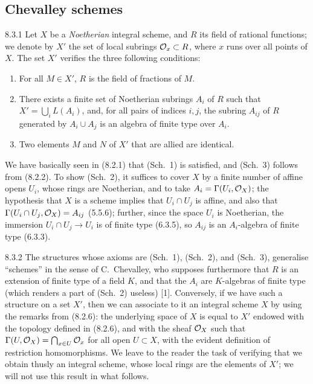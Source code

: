 \documentclass[../main.tex]{subfiles}
\begin{document}
\subsection{Chevalley schemes}

\begin{cx}{8.3.1}
    Let $X$ be a \emph{Noetherian} integral scheme, and $R$ its field of rational functions; we denote by $X'$ the set of local subrings $\mathcal{O}_x\subset R$, where $x$ runs over all points of $X$.
    The set $X'$ verifies the three following conditions:
    \begin{enumerate}
        \item[(Sch. 1)] For all $M\in X'$, $R$ is the field of fractions of $M$.
        \item[(Sch. 2)] There exists a finite set of Noetherian subrings $A_i$ of $R$ such that $X'=\bigcup_i L(A_i)$, and, for all pairs of indices $i,j$, the subring $A_{ij}$ of $R$ generated by $A_i\cup A_j$ is an algebra of finite type over $A_i$.
        \item[(Sch. 3)] Two elements $M$ and $N$ of $X'$ that are allied are identical.
    \end{enumerate}
\end{cx}

We have basically seen in (8.2.1) that (Sch.~1) is satisfied, and (Sch.~3) follows from (8.2.2).
To show (Sch.~2), it suffices to cover $X$ by a finite number of affine opens $U_i$, whose rings are Noetherian, and to take $A_i=\Gamma(U_i,\mathcal{O}_X)$; the hypothesis that $X$ is a scheme implies that $U_i\cap U_j$ is affine, and also that $\Gamma(U_i\cap U_j,\mathcal{O}_X)=A_{ij}$ (5.5.6); further, since the space $U_i$ is Noetherian, the immersion $U_i\cap U_j\to U_i$ is of finite type (6.3.5), so $A_{ij}$ is an $A_i$-algebra of finite type (6.3.3).

\begin{cx}{8.3.2}
    The structures whose axioms are (Sch.~1), (Sch.~2), and (Sch.~3), generalise ``schemes'' in the sense of C.~Chevalley, who supposes furthermore that $R$ is an extension of finite type of a field $K$, and that the $A_i$ are $K$-algebras of finite type (which renders a part of (Sch.~2) useless) [1].
    Conversely, if we have such a structure on a set $X'$, then we can associate to it an integral scheme $X$ by using the remarks from (8.2.6): the underlying space of $X$ is equal to $X'$ endowed with the topology defined in (8.2.6), and with the sheaf $\mathcal{O}_X$ such that $\Gamma(U,\mathcal{O}_X)=\bigcap_{x\in U}\mathcal{O}_x$ for all open $U\subset X$, with the evident definition of restriction homomorphisms.
    We leave to the reader the task of verifying that we obtain thusly an integral scheme, whose local rings are the elements of $X'$; we will not use this result in what follows.
\end{cx}
\end{document}
